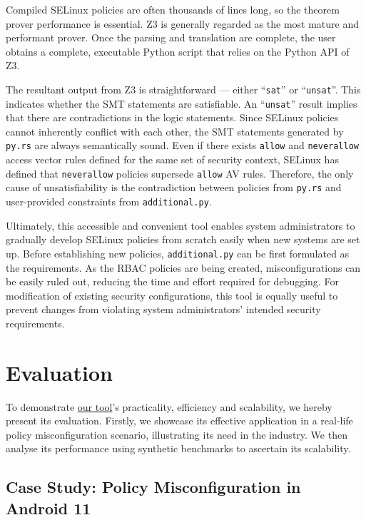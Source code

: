 \documentclass[acmsmall,screen,nonacm]{acmart}
\begin{document}
Compiled SELinux policies are often thousands of lines long, so the theorem 
prover performance is essential. Z3 is generally regarded as the most mature 
and performant prover. Once the parsing and translation are complete, the user 
obtains a complete, executable Python script that relies on the Python API of 
Z3.

The resultant output from Z3 is straightforward --- either ``\texttt{sat}'' or 
``\texttt{unsat}''. This indicates whether the SMT statements are satisfiable. 
An ``\texttt{unsat}'' result implies that there are contradictions in the logic 
statements. Since SELinux policies cannot inherently conflict with each other, 
the SMT statements generated by \texttt{py.rs} are always semantically sound. 
Even if there exists \texttt{allow} and \texttt{neverallow} access vector rules 
defined for the same set of security context, SELinux has defined that 
\texttt{neverallow} policies supersede \texttt{allow} AV rules. Therefore, the 
only cause of unsatisfiability is the contradiction between policies from 
\texttt{py.rs} and user-provided constraints from \texttt{additional.py}.

Ultimately, this accessible and convenient tool enables system administrators 
to gradually develop SELinux policies from scratch easily when new systems are 
set up. Before establishing new policies, \texttt{additional.py} can be first 
formulated as the requirements. As the RBAC policies are being created, 
misconfigurations can be easily ruled out, reducing the time and effort 
required for debugging. For modification of existing security configurations, 
this tool is equally useful to prevent changes from violating system 
administrators' intended security requirements.

\section{Evaluation}

To demonstrate \href{https://github.com/tsoutsman/comp2560}{our tool}'s 
practicality, efficiency and scalability, we hereby present its evaluation. 
Firstly, we showcase its effective application in a real-life policy 
misconfiguration scenario, illustrating its need in the industry. We then 
analyse its performance using synthetic benchmarks to ascertain its scalability.

\subsection{Case Study: Policy Misconfiguration in Android 11}
\label{sec:case-study}
\end{document}
